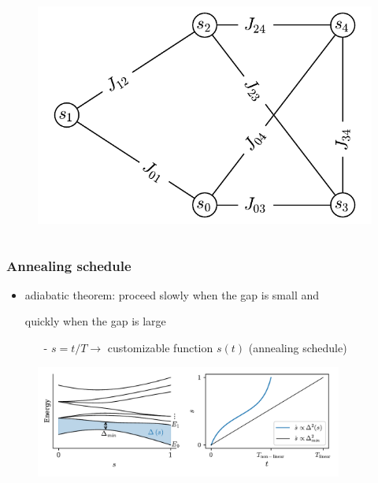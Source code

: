 \documentclass[11pt]{beamer}
\newcommand{\itemb}{\item[$\bullet$]}
\begin{document}
\begin{frame}
\begin{columns}
\begin{column}{0.4\textwidth}
            \vspace*{-2em}
            \begin{figure}[!htb]
                \hspace*{-2em}
                \includegraphics[width=\textwidth]{../plots/graph_instance.pdf}
            \end{figure}
        \end{column}
    \end{columns}
\end{frame}

\begin{frame}
    \frametitle{Annealing schedule}
    \begin{itemize}
        \setlength{\itemindent}{-1em}
        \itemb adiabatic theorem: proceed slowly when the gap is small and
        \item [] quickly when the gap is large
        \begin{itemize}
            \setlength{\itemindent}{-1em}
            \item [-] $s = t/T \to$ customizable function $s(t)$ (annealing schedule)
        \end{itemize}
    \end{itemize}
    \begin{figure}[!htb]
        \centering
        \includegraphics[width=0.9\textwidth]{../plots/ising_gap_with_annealing_schedule.pdf}
    \end{figure}
\end{frame}
\end{document}
